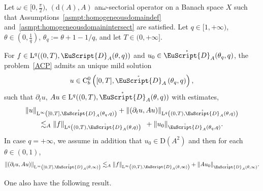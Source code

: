 \documentclass[AHL,Unicode,longabstracts,published]{cedram}
\newcommand{\rmd}{\mathrm{d}}
\newcommand{\rmD}{\mathrm{D}}
\newcommand{\rmL}{\mathrm{L}}
\newcommand{\rmC}{\mathrm{C}}
\newcommand{\rgeusD}{\mathring{\eus{D}}}
\newcommand{\eus}{\EuScript}
\begin{document}
\begin{theo} \label{thm:DaPratoGrisvardHom2020}
Let $\omega\in [0,\frac{\pi}{2})$, $(\rmd(A),A)$ an\linebreak $\omega$-sectorial operator on a Banach space $X$ such that Assumptions~\ref{asmpt:homogeneousdomaindef} and~\ref{asmpt:homogeneousdomainintersect} are satisfied. Let $q\in [1,+\infty)$, $\theta\in(0,\tfrac{1}{q})$, $\theta_q:= \theta +1-1/q$, and let $T\in(0,+\infty]$.

For $f\in \rmL^q((0,T),{\eus{D}}_{A}(\theta,q))$ and $u_0\in \rgeusD_{A}(\theta_q,q)$, the problem~\eqref{ACP} admits an unique mild solution
\begin{align*}
u\in \rmC ^0_{b}\left([0,T],\rgeusD_{A}\left(\theta_q,q\right)\right),
\end{align*}
such that $\partial_t u$, $Au\in \rmL^q((0,T),\rgeusD_{A}(\theta,q))$ with estimates,
\begin{multline} \label{estimateLqMaxRegDaPratoGrisvardHom}
\| u\|_{\rmL^\infty\left([0,T],\rgeusD_{A}(\theta_q,q)\right)} + \left\|\left(\partial_t u, Au\right)\right\|_{\rmL^q\left((0,T),\rgeusD_{A}(\theta,q)\right)}\\
\lesssim_{A}\| f\|_{\rmL^q\left((0,T),\rgeusD_{A}(\theta,q)\right)}\;\: + \| u_0\|_{\rgeusD_{A}(\theta_q,q)}.
\end{multline}
In case $q=+\infty$, we assume in addition that $u_0\in \rmD(A^2)$ and then for each $\theta\in (0,1)$,
\begin{align}
\left\| (\partial_t u, Au)\right\|_{\rmL^\infty\left([0,T],\rgeusD_{A}(\theta,\infty)\right)} \lesssim_{A} \| f\|_{\rmL^\infty\left((0,T),{\eus{D}}_{A}(\theta,\infty)\right)} + \| A u_0\|_{\rgeusD_{A}(\theta,\infty)}.
\end{align}
\end{theo}

One also have the following result.
\end{document}
